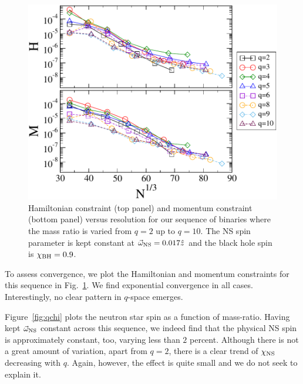 \begin{figure}
\centerline{\hspace*{1.5cm}\includegraphics[scale=0.95]{chap4/qSeqHam}}
\caption[Hamiltonian and momentum constraint for the $q$
sequence.]{\label{fig:qSeqHam}Hamiltonian constraint (top panel) and
  momentum constraint (bottom panel) versus resolution for our
  sequence of binaries where the mass ratio is varied from $q=2$ up to
  $q=10$. The NS spin parameter is kept constant at
  $\vec\omega_{\rm NS}=0.017\hat z$ and the black hole spin is
  $\chi_{\rm BH}=0.9$. }
\end{figure}

To assess convergence, we plot the Hamiltonian and momentum
constraints for this sequence in Fig.~\ref{fig:qSeqHam}. We find
exponential convergence in all cases. Interestingly, no clear pattern
in $q$-space emerges.

Figure~\ref{fig:qchi} plots the neutron star spin as a function of mass-ratio.
Having kept $\vec\omega_{\rm NS}$ constant across this sequence, 
we indeed find that the physical NS spin is approximately constant, too, varying less than $2$ percent.  Although there is not a great amount of variation,
apart from $q=2$, there is a clear trend of $\chi_{\rm NS}$ decreasing
with $q$. Again, however, the effect is quite small and we do not seek
to explain it.

